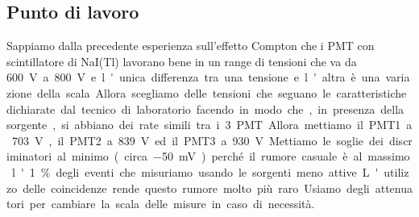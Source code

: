 \subsection{Punto di lavoro}

Sappiamo dalla precedente esperienza sull'effetto Compton che i PMT con scintillatore di NaI(Tl) lavorano bene in un range di tensioni che va da \SI{600}V a \SI{800}V e l'unica differenza tra una tensione e l'altra è una variazione della scala.
Allora scegliamo delle tensioni che seguano le caratteristiche dichiarate dal tecnico di laboratorio facendo in modo che, in presenza della sorgente, si abbiano dei rate simili tra i 3 PMT.
Allora mettiamo il PMT1 a \SI{703}V, il PMT2 a \SI{839}V ed il PMT3 a \SI{930}V.

Mettiamo le soglie dei discriminatori al minimo (circa \SI{-50}{mV}) perché il rumore casuale è al massimo l'1\% degli eventi che misuriamo usando le sorgenti meno attive. L'utilizzo delle coincidenze rende questo rumore molto più raro. Usiamo degli attenuatori per cambiare la scala delle misure in caso di necessità.
